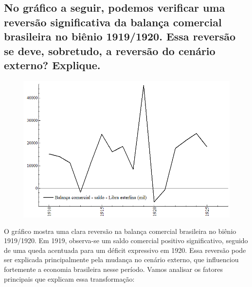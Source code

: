\documentclass[a4paper,12pt]{article}[abntex2]
\begin{document}
\subsection{\textbf{No gráfico a seguir, podemos verificar uma reversão significativa da balança comercial brasileira no biênio 1919/1920. Essa reversão se deve, sobretudo, a reversão do cenário externo? Explique.}}

\begin{figure}[H]
    \centering
    \includegraphics[width=1.0\textwidth]{i1d3.png}
    \end{figure}

O gráfico mostra uma clara reversão na balança comercial brasileira no biênio 1919/1920. Em 1919, observa-se um saldo comercial positivo significativo, seguido de uma queda acentuada para um déficit expressivo em 1920. Essa reversão pode ser explicada principalmente pela mudança no cenário externo, que influenciou fortemente a economia brasileira nesse período. Vamos analisar os fatores principais que explicam essa transformação:
\end{document}
